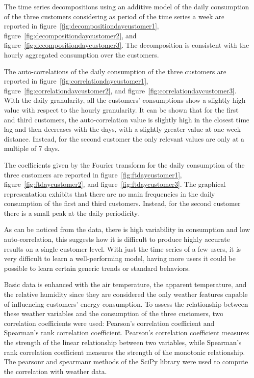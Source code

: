 The time series decompositions using an additive model of the daily consumption of the three customers considering as period of the time series a week are reported in figure~\ref{fig:decompositiondaycustomer1}, figure~\ref{fig:decompositiondaycustomer2}, and figure~\ref{fig:decompositiondaycustomer3}.
The decomposition is consistent with the hourly aggregated consumption over the customers.

The auto-correlations of the daily consumption of the three customers are reported in figure~\ref{fig:correlationdaycustomer1},  figure~\ref{fig:correlationdaycustomer2}, and  figure~\ref{fig:correlationdaycustomer3}.
With the daily granularity, all the customers’ consumptions show a slightly high value with respect to the hourly granularity.
It can be shown that for the first and third customers, the auto-correlation value is slightly high in the closest time lag and then decreases with the days, with a slightly greater value at one week distance.
Instead, for the second customer the only relevant values are only at a multiple of 7 days.

The coefficients given by the Fourier transform for the daily consumption of the three customers are reported in figure~\ref{fig:ftdaycustomer1}, figure~\ref{fig:ftdaycustomer2}, and figure~\ref{fig:ftdaycustomer3}.
The graphical representation exhibits that there are no main frequencies in the daily consumption of the first and third customers.
Instead, for the second customer there is a small peak at the daily periodicity.

As can be noticed from the data, there is high variability in consumption and low auto-correlation, this suggests how it is difficult to produce highly accurate results on a single customer level.
With just the time series of a few users, it is very difficult to learn a well-performing model, having more users it could be possible to learn certain generic trends or standard behaviors.

Basic data is enhanced with the air temperature, the apparent temperature, and the relative humidity since they are considered the only weather features capable of influencing customers' energy consumption.
To assess the relationship between these weather variables and the consumption of the three customers, two correlation coefficients were used: Pearson's correlation coefficient and Spearman's rank correlation coefficient.
Pearson's correlation coefficient measures the strength of the linear relationship between two variables, while Spearman's rank correlation coefficient measures the strength of the monotonic relationship.
The pearsonr and spearmanr methods of the SciPy library were used to compute the correlation with weather data.

